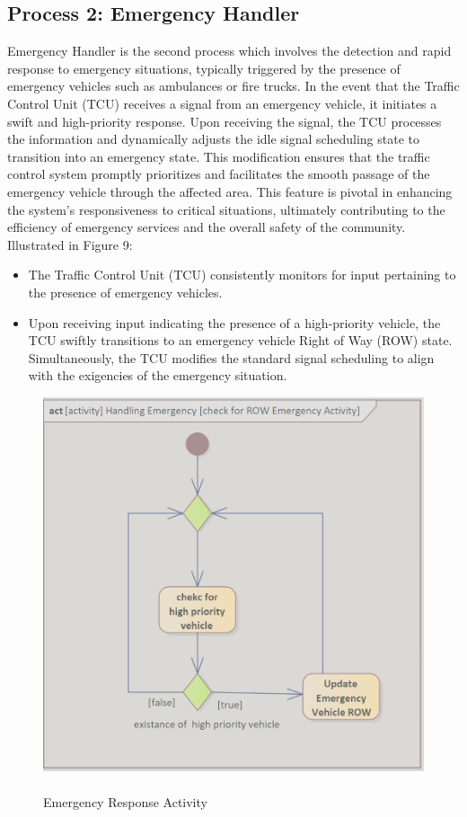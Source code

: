 \subsection{Process 2: Emergency Handler}
\label{subsec:process_2}
Emergency Handler is the second process which involves the detection and rapid response to emergency situations, typically triggered by the presence of emergency vehicles such as ambulances or fire trucks. In the event that the Traffic Control Unit (TCU) receives a signal from an emergency vehicle, it initiates a swift and high-priority response.
Upon receiving the signal, the TCU processes the information and dynamically adjusts the idle signal scheduling state to transition into an emergency state. This modification ensures that the traffic control system promptly prioritizes and facilitates the smooth passage of the emergency vehicle through the affected area. This feature is pivotal in enhancing the system's responsiveness to critical situations, ultimately contributing to the efficiency of emergency services and the overall safety of the community. Illustrated in Figure 9:
\begin{itemize}
\item 
The Traffic Control Unit (TCU) consistently monitors for input pertaining to the presence of emergency vehicles.
\item Upon receiving input indicating the presence of a high-priority vehicle, the TCU swiftly transitions to an emergency vehicle Right of Way (ROW) state. Simultaneously, the TCU modifies the standard signal scheduling to align with the exigencies of the emergency situation. 
\end{itemize}
\begin{figure}[h]
\centering
\includegraphics[width=0.5\linewidth]{images/process_2_activity.png}
\caption{\label{fig:process_2_activity}\\Emergency Response Activity}
\end{figure}
